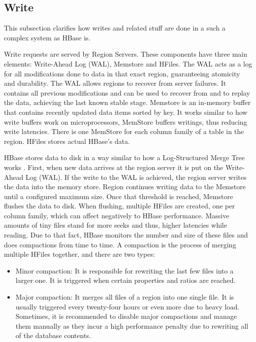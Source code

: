\subsection {Write}
This subsection clarifies how writes and related stuff are done in a such a complex system as HBase is.
\par
Write requests are served by Region Servers. These components have three main elements: Write-Ahead Log (WAL), Memstore and HFiles. The WAL acts as a log for all modifications done to data in that exact region, guaranteeing atomicity and durability. The WAL allows regions to recover from server failures. It contains all previous modifications and can be used to recover from and to replay the data, achieving the last known stable stage. Memstore is an in-memory buffer that contains recently updated data items sorted by key. It works similar to how write buffers work on microprocessors, MemStore buffers writings, thus reducing write latencies. There is one MemStore for each column family of a table in the region. HFiles stores actual HBase's data.
\par
HBase stores data to disk in a way similar to how a Log-Structured Merge Tree works \cite{o1996log}. First, when new data arrives at the region server it is put on the Write-Ahead Log (WAL). If the write to the WAL is achieved, the region server writes the data into the memory store. Region continues writing data to the Memstore until a configured maximum size. Once that threshold is reached, Memstore flushes the data to disk. When flushing, multiple HFiles are created, one per column family, which can affect negatively to HBase performance. Massive amounts of tiny files stand for more seeks and thus, higher latencies while reading. Due to that fact, HBase monitors the number and size of these files and does compactions from time to time. A compaction is the process of merging multiple HFiles together,  and there are two types:
\begin{itemize}
\item Minor compaction: It is responsible for rewriting the last few files into a larger one. It is triggered when certain properties and ratios are reached.
\item Major compaction: It merges all files of a region into one single file. It is usually triggered every twenty-four hours or even more due to heavy load. Sometimes, it is recommended to disable major compactions and manage them manually as they incur a high performance penalty due to rewriting all of the database contents.
\end{itemize}


